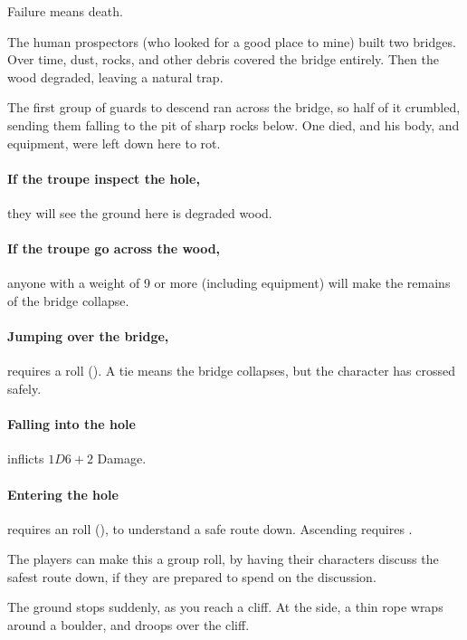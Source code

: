 \begin{multicols}{2}
Failure means death.


\begin{exampletext}
  The human prospectors (who looked for a good place to mine) built two bridges.
  Over time, dust, rocks, and other debris covered the bridge entirely.
  Then the wood degraded, leaving a natural trap.

  The first group of \glspl{guard} to descend ran across the bridge, so half of it crumbled, sending them falling to the pit of sharp rocks below.
  One died, and his body, and equipment, were left down here to rot.
\end{exampletext}

\paragraph{If the troupe inspect the hole,}
they will see the ground here is degraded wood.

\paragraph{If the troupe go across the wood,}
anyone with a \gls{weight} of 9 or more (including equipment) will make the remains of the bridge collapse.

\paragraph{Jumping over the bridge,}
requires a  roll (\tn[9]).
A tie means the bridge collapses, but the character has crossed safely.

\paragraph{Falling into the hole}
inflicts $1D6+2$ Damage.

\paragraph{Entering the hole}
requires an  roll (\tn[10]), to understand a safe route down.
Ascending requires \tn[12].

The players can make this a group roll, by having their characters discuss the safest route down, if they are prepared to spend  on the discussion.

\begin{boxtext}
  The ground stops suddenly, as you reach a cliff.
  At the side, a thin rope wraps around a boulder, and droops over the cliff.
\end{boxtext}


\end{multicols}
